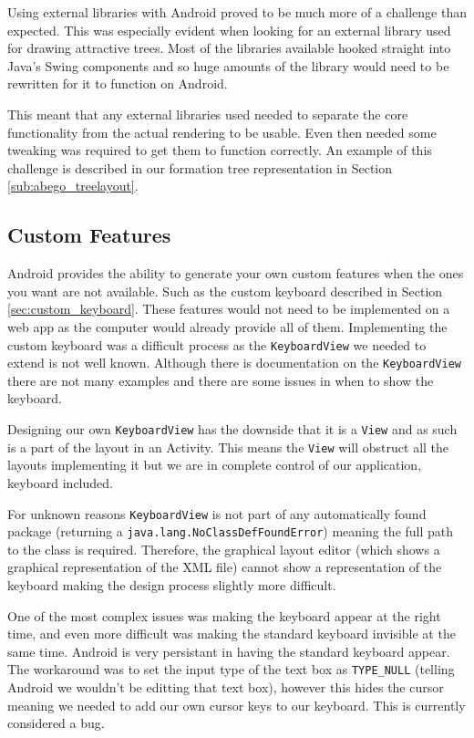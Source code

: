 \documentclass{report}
\begin{document}
Using external libraries with Android proved to be much more of a challenge than expected. This was especially evident when looking for an external library used for drawing attractive trees. Most of the libraries available hooked straight into Java's Swing components and so huge amounts of the library would need to be rewritten for it to function on Android.

This meant that any external libraries used needed to separate the core functionality from the actual rendering to be usable. Even then needed some tweaking was required to get them to function correctly. An example of this challenge is described in our formation tree representation in Section \ref{sub:abego_treelayout}.

\subsection{Custom Features}

Android provides the ability to generate your own custom features when the ones you want are not available. Such as the custom keyboard described in Section \ref{sec:custom_keyboard}. These features would not need to be implemented on a web app as the computer would already provide all of them. Implementing the custom keyboard was a difficult process as the {\tt KeyboardView} we needed to extend is not well known. Although there is documentation on the {\tt KeyboardView} there are not many examples and there are some issues in when to show the keyboard.

Designing our own {\tt KeyboardView} has the downside that it is a {\tt View} and as such is a part of the layout in an Activity. This means the {\tt View} will obstruct all the layouts implementing it but we are in complete control of our application, keyboard included.

For unknown reasons {\tt KeyboardView} is not part of any automatically found package (returning a {\tt java.lang.NoClassDefFoundError}) meaning the full path to the class is required. Therefore, the graphical layout editor (which shows a graphical representation of the XML file) cannot show a representation of the keyboard making the design process slightly more difficult.

One of the most complex issues was making the keyboard appear at the right time, and even more difficult was making the standard keyboard invisible at the same time. Android is very persistant in having the standard keyboard appear. The workaround was to set the input type of the text box as {\tt TYPE\_NULL} (telling Android we wouldn't be editting that text box), however this hides the cursor meaning we needed to add our own cursor keys to our keyboard. This is currently considered a bug.
\end{document}
